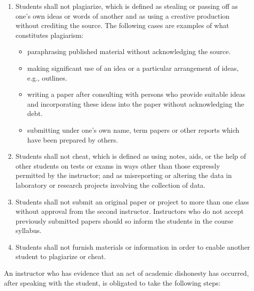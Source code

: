 \documentclass[11pt]{article}
\begin{document}
\begin{enumerate}
\item Students shall not plagiarize, which is defined as stealing or passing
  off as one's own ideas or words of another and as using a creative production
  without crediting the source. The following cases are examples of what
  constitutes plagiarism:
  \begin{itemize}
  \item paraphrasing published material without acknowledging the source.
  \item  making significant use of an idea or a particular arrangement of ideas,
    e.g., outlines.
  \item  writing a paper after consulting with persons who provide suitable
    ideas and incorporating these ideas into the paper without acknowledging the debt.
  \item submitting under one’s own name, term papers or other reports which have
    been prepared by others.
  \end{itemize}
\item Students shall not cheat, which is defined as using notes, aids, or
  the help of other students on tests or exams in ways other than those expressly
  permitted by the instructor; and as misreporting or altering the data in laboratory
  or research projects involving the collection of data.
\item Students shall not submit an original paper or project to more than one class
  without approval from the second instructor. Instructors who do not accept previously
  submitted papers should so inform the students in the course syllabus.
\item Students shall not furnish materials or information in order to enable another
  student to plagiarize or cheat.
\end{enumerate}


An instructor who has evidence that an act of academic dishonesty has occurred,
after speaking with the student, is obligated to take the following steps:
\end{document}
